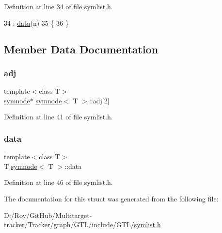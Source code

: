 Definition at line 34 of file symlist.\+h.


\begin{DoxyCode}
34                         : \mbox{\hyperlink{structsymnode_a079c4145d1af3d5ddab2cc9c7b3e0563}{data}}(n)
35     \{
36     \}
\end{DoxyCode}


\subsection{Member Data Documentation}
\mbox{\label{structsymnode_aba7e8f525fb4d85417384a6ccff59241}} 
\subsubsection{\texorpdfstring{adj}{adj}}
{\footnotesize\ttfamily template$<$class T$>$ \\
\mbox{\hyperlink{structsymnode}{symnode}}$\ast$ \mbox{\hyperlink{structsymnode}{symnode}}$<$ T $>$\+::adj\mbox{[}2\mbox{]}}



Definition at line 41 of file symlist.\+h.

\mbox{\label{structsymnode_a079c4145d1af3d5ddab2cc9c7b3e0563}} 
\subsubsection{\texorpdfstring{data}{data}}
{\footnotesize\ttfamily template$<$class T$>$ \\
T \mbox{\hyperlink{structsymnode}{symnode}}$<$ T $>$\+::data}



Definition at line 46 of file symlist.\+h.



The documentation for this struct was generated from the following file\+:\begin{DoxyCompactItemize}
\item 
D\+:/\+Roy/\+Git\+Hub/\+Multitarget-\/tracker/\+Tracker/graph/\+G\+T\+L/include/\+G\+T\+L/\mbox{\hyperlink{symlist_8h}{symlist.\+h}}\end{DoxyCompactItemize}
